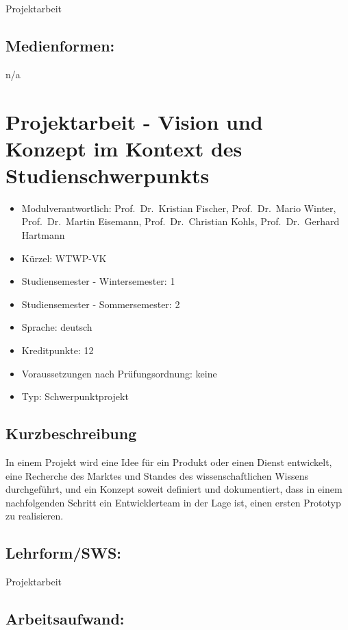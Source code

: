 Projektarbeit

\section*{Medienformen:}\label{medienformen-9}

n/a

\chapter{Projektarbeit - Vision und Konzept im Kontext des
Studienschwerpunkts}\label{projektarbeit---vision-und-konzept-im-kontext-des-studienschwerpunkts}

\begin{itemize}
\tightlist
\item
  Modulverantwortlich: Prof.~Dr.~Kristian Fischer, Prof.~Dr.~Mario
  Winter, Prof.~Dr.~Martin Eisemann, Prof.~Dr.~Christian Kohls,
  Prof.~Dr.~Gerhard Hartmann
\item
  Kürzel: WTWP-VK
\item
  Studiensemester - Wintersemester: 1
\item
  Studiensemester - Sommersemester: 2
\item
  Sprache: deutsch
\item
  Kreditpunkte: 12
\item
  Voraussetzungen nach Prüfungsordnung: keine
\item
  Typ: Schwerpunktprojekt
\end{itemize}

\section*{Kurzbeschreibung}\label{kurzbeschreibung-4}

In einem Projekt wird eine Idee für ein Produkt oder einen Dienst
entwickelt, eine Recherche des Marktes und Standes des
wissenschaftlichen Wissens durchgeführt, und ein Konzept soweit
definiert und dokumentiert, dass in einem nachfolgenden Schritt ein
Entwicklerteam in der Lage ist, einen ersten Prototyp zu realisieren.

\section*{Lehrform/SWS:}\label{lehrformsws-10}

Projektarbeit

\section*{Arbeitsaufwand:}\label{arbeitsaufwand-16}

